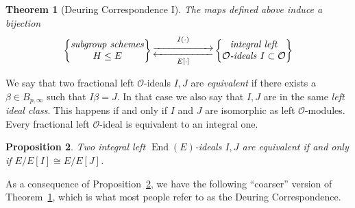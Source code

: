 \documentclass[10pt]{article}
\theoremstyle{plain}
\newtheorem{theorem}{Theorem}
\newtheorem{proposition}[theorem]{Proposition}
\theoremstyle{definition}
\DeclareMathOperator{\End}{End} %
\def\O{\ensuremath{\mathcal{O}}}
\begin{document}
\begin{prposition}
\begin{theorem}[Deuring Correspondence I]\label{thm:deuring1}
    The maps defined above induce a bijection
    \begin{equation*}
        \left\{
            \begin{tabular}{@{} c @{}}
                \emph{subgroup schemes} \\
                $H\leq E$
            \end{tabular}
        \right\}
        \begin{gathered}
            \overset{I(\cdot)}{\xrightarrow{\hspace*{2cm}}} \\[-2ex]
            \underset{E[\cdot]}{\xleftarrow{\hspace*{2cm}}}
        \end{gathered}
        \left\{
            \begin{tabular}{@{} c @{}}
                \emph{integral left} \\
                $\O$\emph{-ideals} $I\subset \O$
            \end{tabular}
        \right\}
    \end{equation*}
\end{theorem}

We say that two fractional left $\O$-ideals $I,J$ are \emph{equivalent}
if there exists a $\beta\in B_{p,\infty}$ such that $I\beta = J$.
In that case we also say that $I,J$ are in the same \emph{left ideal class}.
This happens if and only if $I$ and $J$ are isomorphic as left $\O$-modules.
Every fractional left $\O$-ideal is equivalent to an integral one.

\begin{proposition}\label{prop:idealclasscurve}
    Two integral left $\End(E)$-ideals $I,J$ are equivalent if and only if
    $E/E[I]\cong E/E[J]$.
\end{proposition}


As a consequence of Proposition~\ref{prop:idealclasscurve},
we have the following ``coarser'' version of Theorem~\ref{thm:deuring1},
which is what most people refer to as the Deuring Correspondence.


\end{prposition}
\end{document}
